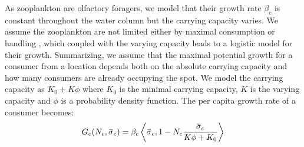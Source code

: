 As zooplankton are olfactory foragers, we model that their growth rate $\beta_c$ is constant throughout the water column but the carrying capacity varies. We assume the zooplankton are not limited either by maximal consumption or handling \citep{kiorboe2011zooplankton}, which coupled with the varying capacity leads to a logistic model for their growth. Summarizing, we assume that the maximal potential growth for a consumer from a location depends both on the absolute carrying capacity and how many consumers are already occupying the spot.
We model the carrying capacity as $K_0 + K \phi$ where $K_0$ is the minimal carrying capacity, $K$ is the varying capacity and $\phi$ is a probability density function. The per capita growth rate of a consumer becomes:
\begin{equation}
  G_c(N_c, \overbar{\sigma}_c) = \beta_c\ip{\overbar{\sigma}_c}{1-N_c \frac{\overbar{\sigma}_c}{K\phi + K_0}}
\end{equation}

